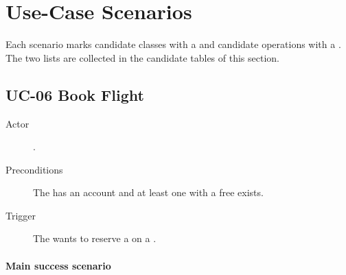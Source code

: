 \section{Use-Case Scenarios}

Each scenario marks candidate classes with a  and
candidate operations with a . The two lists are
collected in the candidate tables of this section.

\subsection*{UC-06 Book Flight}

\begin{description}
\item[Actor] .
\item[Preconditions] The  has an account and at least one
   with a free  exists.
\item[Trigger] The  wants to reserve a  on a
  .
\end{description}

\paragraph{Main success scenario}

